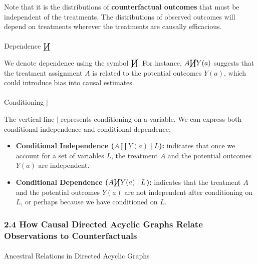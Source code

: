 \documentclass[
  single column]{article}
\makeatletter
\let\oldparagraph\paragraph
\renewcommand{\paragraph}{
    \@ifstar
      \xxxParagraphStar
      \xxxParagraphNoStar
  }
\newcommand{\xxxParagraphStar}[1]{\oldparagraph*{#1}\mbox{}}
\newcommand{\xxxParagraphNoStar}[1]{\oldparagraph{#1}\mbox{}}
\providecommand{\tightlist}{%
  \setlength{\itemsep}{0pt}\setlength{\parskip}{0pt}}\usepackage{longtable,booktabs,array}
\makeatother
\begin{document}
Note that it is the distributions of \textbf{counterfactual outcomes}
that must be independent of the treatments. The distributions of
observed outcomes will depend on treatments wherever the treatments are
causally efficacious.

\paragraph{\texorpdfstring{Dependence
\(\cancel{\coprod}\)}{Dependence \textbackslash cancel\{\textbackslash coprod\}}}\label{dependence-cancelcoprod}

We denote dependence using the symbol \(\cancel{\coprod}\). For
instance, \(A \cancel{\coprod} Y(a)\) suggests that the treatment
assignment \(A\) is related to the potential outcomes \(Y(a)\), which
could introduce bias into causal estimates.

\paragraph{\texorpdfstring{Conditioning
\(|\)}{Conditioning \textbar{}}}\label{conditioning}

The vertical line \(|\) represents conditioning on a variable. We can
express both conditional independence and conditional dependence:

\begin{itemize}
\tightlist
\item
  \textbf{Conditional Independence (\(A \coprod Y(a) \mid L\)):}
  indicates that once we account for a set of variables \(L\), the
  treatment \(A\) and the potential outcomes \(Y(a)\) are independent.
\item
  \textbf{Conditional Dependence (\(A \cancel{\coprod} Y(a) \mid L\)):}
  indicates that the treatment \(A\) and the potential outcomes \(Y(a)\)
  are not independent after conditioning on \(L\), or perhaps because we
  have conditioned on \(L\).
\end{itemize}

\subsubsection{2.4 How Causal Directed Acyclic Graphs Relate
Observations to
Counterfactuals}\label{how-causal-directed-acyclic-graphs-relate-observations-to-counterfactuals}

\paragraph{Ancestral Relations in Directed Acyclic
Graphs}\label{ancestral-relations-in-directed-acyclic-graphs}
\end{document}
